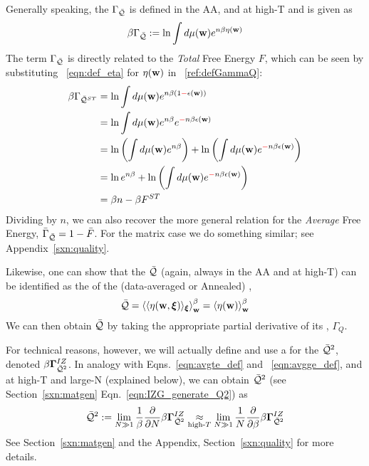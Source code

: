 Generally speaking, the \Quality \GeneratingFunction $\Gamma_{\bar{\mathcal{Q}}}$ is defined in the AA, and at high-T and is given as
\begin{align}
  \label{ref:defGammaQ}
  \beta\Gamma_{\bar{\mathcal{Q}}} := \ln\int d\mu({\mathbf{w}}) e^{n\beta\eta({\mathbf{w}})}
\end{align}
The term $\Gamma_{\bar{\mathcal{Q}}}$ is directly related to the \emph{Total} Free Energy $F$, which can be seen by substituting \EQN~\ref{eqn:def_eta}
for $\eta({\mathbf{w}})$ in \EQN~\ref{ref:defGammaQ}:
\begin{align}
  \label{ref:defGammaQtoF}
  \beta\Gamma_{\bar{\mathcal{Q}}^{ST}}
  &= \ln\int d\mu({\mathbf{w}}) e^{n\beta(1{\color{red}\sf{-}}\epsilon({\mathbf{w}}))} \\ \nonumber
    &= \ln\int d\mu({\mathbf{w}}) e^{n\beta}e^{{\color{red}\sf{-}}n\beta\epsilon({\mathbf{w}})} \\ \nonumber
    &= \ln\left(\int d\mu({\mathbf{w}}) e^{n\beta}\right)+\ln\left(\int d\mu({\mathbf{w}})e^{{\color{red}\sf{-}}n\beta\epsilon({\mathbf{w}})}\right) \\ \nonumber
   &= \ln e^{n\beta}+\ln\left(\int d\mu({\mathbf{w}})e^{{\color{red}\sf{-}}n\beta\epsilon({\mathbf{w}})}\right) \\ \nonumber
  &= \beta n-\beta F^{ST}
\end{align}
Dividing by $n$, we can also recover the more general relation for the \emph{Average} Free Energy,
$\bar{\Gamma}_{\bar{\mathcal{Q}}}=1-\bar{F}$. For the matrix case we do something similar; see Appendix~\ref{sxn:quality}.

Likewise, one can show that the \Quality $\bar{\mathcal{Q}}$
(again, always in the AA and at high-T) can be identified as the \ThermalAverage of the (data-averaged or Annealed)
\SelfOverlap, 
\begin{align}
  \label{eqn:Q_def_eta}
  \bar{\mathcal{Q}} = \left\langle \langle\eta({\mathbf{w}},\boldsymbol{\xi})\rangle_{\boldsymbol{\xi}} \right\rangle_{\mathbf w}^{\beta} =\left\langle \eta({\mathbf{w}}) \right\rangle_{\mathbf w}^{\beta}
\end{align}
We can then obtain $\bar{\mathcal{Q}}$ by taking the appropriate partial derivative of its \GeneratingFunction, $\Gamma_{Q}$.

For technical reasons, however, we will actually define and use a
\GeneratingFunction for the \AverageLayerQualitySquared $\bar{\mathcal{Q}}^{2}$, denoted $\beta\mathbf{\Gamma}^{IZ}_{\bar{\mathcal{Q}}^{2}}$.
In analogy with Eqns.~\ref{eqn:avgte_def} and ~\ref{eqn:avgge_def}, and at high-T and large-N (explained below),
we can obtain $\bar{\mathcal{Q}}^{2}$ (see Section~\ref{sxn:matgen} Eqn.~\ref{eqn:IZG_generate_Q2}) as
\begin{align}
  \label{eqn:QT_def}
  \bar{\mathcal{Q}}^{2} := \lim_{N\gg 1}\frac{1}{\beta}\frac{\partial }{\partial N}\beta\mathbf{\Gamma}^{IZ}_{\bar{\mathcal{Q}}^{2}}
  \underset{\text{high-}T}{\approx}
\lim_{N\gg 1}\frac{1}{N}\frac{\partial }{\partial \beta}\beta\mathbf{\Gamma}^{IZ}_{\bar{\mathcal{Q}}^{2}}
\end{align}
See Section~\ref{sxn:matgen} and the Appendix, Section~\ref{sxn:quality} for more details.


